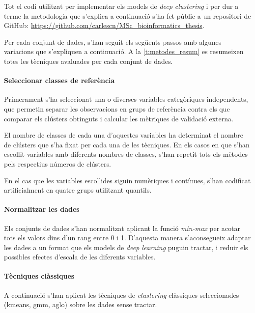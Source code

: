 \documentclass[CAT,BIB]{TFUOC}%
\begin{document}
    Tot el codi utilitzat per implementar els models de \textit{deep clustering}
    i per dur a terme la metodologia que s'explica a continuació
    s'ha fet públic a un repositori de GitHub:
    \url{https://github.com/carlescn/MSc_bioinformatics_thesis}.

    Per cada conjunt de dades,
    s'han seguit els següents passos
    amb algunes variacions que s'expliquen a continuació.
    A la \cref{t:metodes_resum} es resumeixen totes les tècniques
    avaluades per cada conjunt de dades.

    \paragraph{Seleccionar classes de referència}
        Primerament s'ha seleccionat una o diverses variables categòriques independents,
        que permetin separar les observacions en grups de referència
        contra els que comparar els clústers obtinguts
        i calcular les mètriques de validació externa.

        El nombre de classes de cada una d'aquestes variables
        ha determinat el nombre de clústers que s'ha fixat per cada una de les tècniques.
        En els casos en que s'han escollit variables amb diferents nombres de classes,
        s'han repetit tots els mètodes pels respectius números de clústers.

        En el cas que les variables escollides siguin numèriques i contínues,
        s'han codificat artificialment en quatre grups utilitzant quantils.

    \paragraph{Normalitzar les dades}
        Els conjunts de dades s'han normalitzat
        aplicant la funció \textit{min-max}
        per acotar tots els valors dins d'un rang entre 0 i 1.
        D'aquesta manera s'aconsegueix
        adaptar les dades a un format que els models de \textit{deep learning} puguin tractar,
        i reduir els possibles efectes d'escala de les diferents variables.

    \paragraph{Tècniques clàssiques}
        A continuació
        s'han aplicat les tècniques de \textit{clustering} clàssiques seleccionades
        (\gls{kmeans}, \gls{gmm}, \gls{aglo})
        sobre les dades sense tractar.
\end{document}

